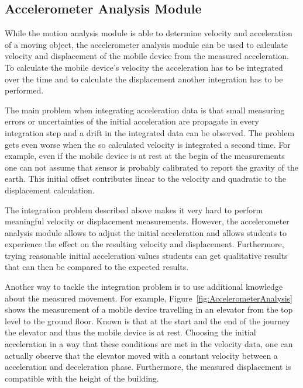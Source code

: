 \documentclass{sigchi}
\begin{document}
\subsection{Accelerometer Analysis Module}
While the motion analysis module is able to determine velocity and acceleration of a moving object, the accelerometer analysis module can be used to calculate velocity and displacement of the mobile device from the measured acceleration.
To calculate the mobile device's velocity the acceleration has to be integrated over the time and to calculate the displacement another integration has to be performed.

The main problem when integrating acceleration data is that small measuring errors or uncertainties of the initial acceleration are propagate in every integration step and a drift in the integrated data can be observed.
The problem gets even worse when the so calculated velocity is integrated a second time.
For example, even if the mobile device is at rest at the begin of the measurements one can not assume that sensor is probably calibrated to report the gravity of the earth.
This initial offset contributes linear to the velocity and quadratic to the displacement calculation.

The integration problem described above makes it very hard to perform meaningful velocity or displacement measurements.
However, the accelerometer analysis module allows to adjust the initial acceleration and allows students to experience the effect on the resulting velocity and displacement.
Furthermore, trying reasonable initial acceleration values students can get qualitative results that can then be compared to the expected results.

Another way to tackle the integration problem is to use additional knowledge about the measured movement.
For example, Figure~\ref{fig:AccelerometerAnalysis} shows the measurement of a mobile device travelling in an elevator from the top level to the ground floor.
Known is that at the start and the end of the journey the elevator and thus the mobile device is at rest.
Choosing the initial acceleration in a way that these conditions are met in the velocity data, one can actually observe that the elevator moved with a constant velocity between a acceleration and deceleration phase.
Furthermore, the measured displacement is compatible with the height of the building.
\end{document}

